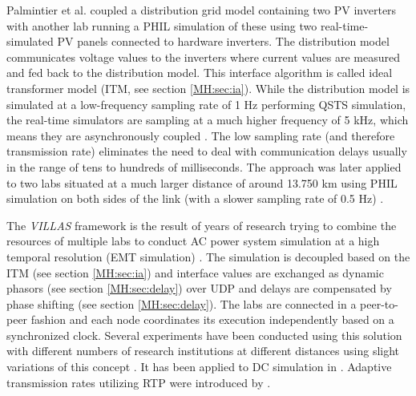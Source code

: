 \documentclass[a4paper]{atseminar}
\begin{document}

Palmintier et al. \cite{palmintier2015} coupled a distribution grid model containing two PV inverters with another lab running a PHIL simulation of these using two real-time-simulated PV panels connected to hardware inverters. The distribution model communicates voltage values to the inverters where current values are measured and fed back to the distribution model. This interface algorithm is called ideal transformer model (ITM, see section \ref{MH:sec:ia}).
While the distribution model is simulated at a low-frequency sampling rate of 1 Hz performing QSTS simulation, the real-time simulators are sampling at a much higher frequency of 5 kHz, which means they are asynchronously coupled \cite{syed2020standard}. The low sampling rate (and therefore transmission rate) eliminates the need to deal with communication delays usually in the range of tens to hundreds of milliseconds.
The approach was later applied to two labs situated at a much larger distance of around 13.750 km using PHIL simulation on both sides of the link (with a slower sampling rate of 0.5 Hz) \cite{lundstrom2017}.


The \textit{VILLAS} framework is the result of years of research trying to combine the resources of multiple labs to conduct AC power system simulation at a high temporal resolution (EMT simulation) \cite{stevic2017europe, monti2018, vogel2019improve}. 
The simulation is decoupled based on the ITM (see section \ref{MH:sec:ia}) and interface values are exchanged as dynamic phasors (see section \ref{MH:sec:delay}) over UDP and delays are compensated by phase shifting \cite{sansano2015harmonic} (see section \ref{MH:sec:delay}). The labs are connected in a peer-to-peer fashion and each node coordinates its execution independently based on a synchronized clock. Several experiments have been conducted using this solution with different numbers of research institutions at different distances using slight variations of this concept \cite{stevic2015feasibility, stevic2015sim, stevic2017europe, vogel2018distributed, monti2018, vogel2019improve}.
It has been applied to DC simulation in \cite{stevic2018dc}. Adaptive transmission rates utilizing RTP were introduced by  \cite{vogel2019improve}.
\end{document}
